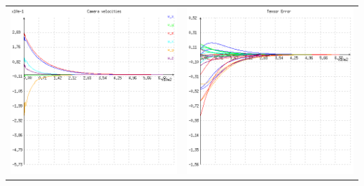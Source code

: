 {\begin{center}
\begin{tabular}{cc}
  \includegraphics[height=0.1\textheight]{figures/plots/ex5cvelocity.png}&
  \includegraphics[height=0.1\textheight]{figures/plots/ex5cerror.png}\\

\end{tabular}
\end{center}}
